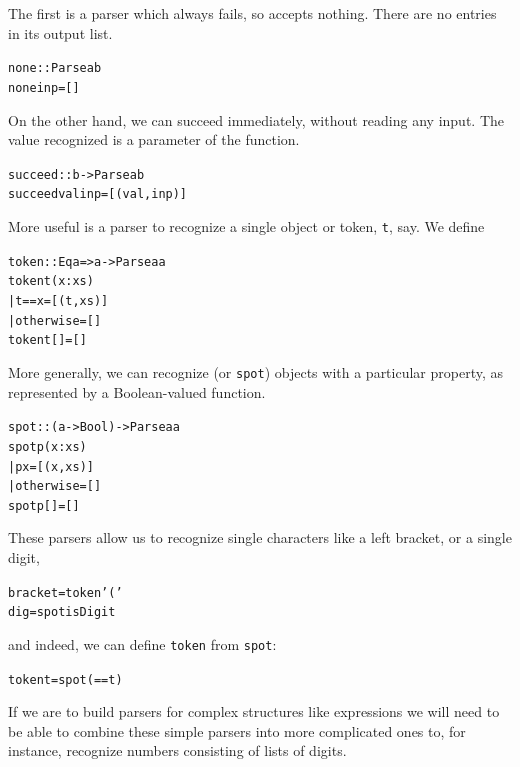 The first is a parser which always fails, so accepts nothing. There
are no entries in its output list.
\begin{alltt}
none :: Parse a b
none inp = []
\end{alltt}
On the other hand, we can succeed immediately, without reading any input.
The value recognized is a parameter of the function.
\begin{alltt}
succeed :: b -> Parse a b 
succeed val inp = [(val,inp)]
\end{alltt}
More useful is a parser to recognize a single object or token, \texttt{t}, say. We
define
\begin{alltt}
token :: Eq a => a -> Parse a a
token t (x:xs) 
  | t==x        = [(t,xs)]
  | otherwise   = []
token t []      = []
\end{alltt}
More generally, we can recognize (or \texttt{spot}) objects with a particular
property, as represented by a Boolean-valued function.
\begin{alltt}
spot :: (a -> Bool) -> Parse a a
spot p (x:xs) 
  | p x         = [(x,xs)]
  | otherwise   = []
spot p []       = []
\end{alltt}
These parsers allow us to recognize single characters like a left bracket,
or a single digit,
\begin{alltt}
bracket = token '('
dig     = spot isDigit
\end{alltt}
and indeed, we can define \texttt{token} from \texttt{spot}:
\begin{alltt}
token t = spot (==t)
\end{alltt}
If we are to build parsers for
complex structures like expressions we will
need to be able to combine these simple parsers into more complicated
ones to, for instance, recognize numbers consisting of lists of digits.

